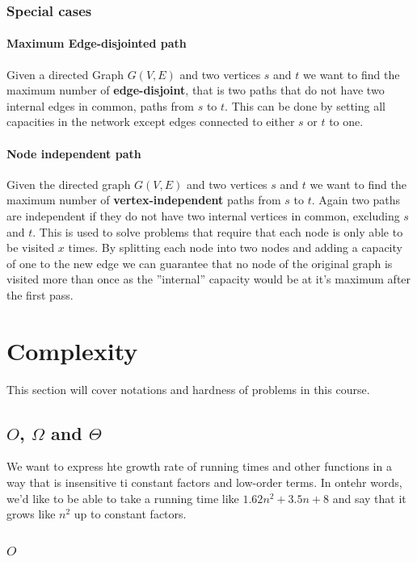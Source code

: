 \documentclass[12pt]{article} %
\begin{document}
\subsubsection{Special cases}

\paragraph{Maximum Edge-disjointed path}
Given a directed Graph $G(V, E)$ and two vertices $s$ and $t$ we want to find the maximum number of \textbf{edge-disjoint}, that is two paths that do not have two internal edges in common, paths from $s$ to $t$. This can be done by setting all capacities in the network except edges connected to either $s$ or $t$ to one.

\paragraph{Node independent path}
Given the directed graph $G(V, E)$ and two vertices $s$ and $t$ we want to find the maximum number of \textbf{vertex-independent} paths from $s$ to $t$. Again two paths are independent if they do not have two internal vertices in common, excluding $s$ and $t$. This is used to solve problems that require that each node is only able to be visited $x$ times. By splitting each node into two nodes and adding a capacity of one to the new edge we can guarantee that no node of the original graph is visited more than once as the ''internal'' capacity would be at it's maximum after the first pass.

\section{Complexity}
This section will cover notations and hardness of problems in this course.

\subsection{$O$, $\Omega$ and $\Theta$}
We want to express hte growth rate of running times and other functions in a way that is insensitive ti constant factors and low-order terms. In ontehr words, we'd like to be able to take a running time like $1.62n^2 + 3.5n + 8$ and say that it grows like $n^2$ up to constant factors. 

\subsubsection{$O$}
\end{document}
